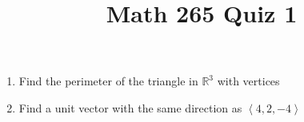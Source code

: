 \documentclass[12pt]{article}
\title{Math 265 Quiz 1}\author{}
\begin{document}
\maketitle
\pagestyle{empty}
\begin{enumerate}
\item Find the perimeter of the triangle in $\mathbb{R}^3$
with vertices
\item Find a unit vector with the same direction as
$\left\langle 4,2,-4\right\rangle$

\end{enumerate}
\end{document}
